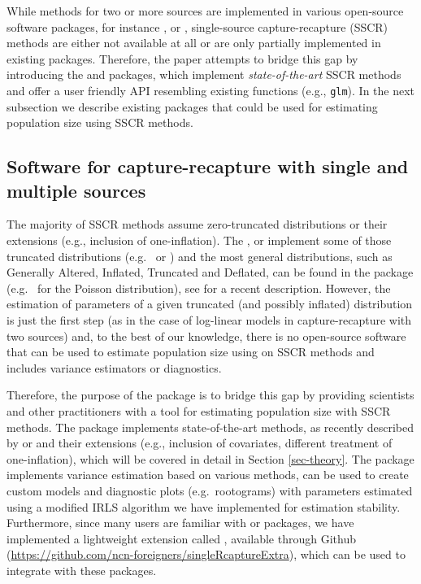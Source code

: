 \documentclass[
]{jss}
\newcommand{\1}{\mathcal{I}} \newcommand{\bZero}{\boldsymbol{0}}
\begin{document}
While methods for two or more sources are implemented in various
open-source software packages, for instance 
\citep{baillargeon2007rcapture},  \citep{laake2013marked} or
 \citep{yee2015vgam}, single-source capture-recapture (SSCR)
methods are either not available at all or are only partially
implemented in existing  packages. Therefore, the paper
attempts to bridge this gap by introducing the  and
 packages, which implement
\emph{state-of-the-art} SSCR methods and offer a user friendly API
resembling existing  functions (e.g., \texttt{glm}). In the
next subsection we describe existing  packages that could be
used for estimating population size using SSCR methods.

\subsection{Software for capture-recapture with single and multiple
sources}\label{sec-software}

The majority of SSCR methods assume zero-truncated distributions or
their extensions (e.g., inclusion of one-inflation). The 
\citep{countreg},  \citep{VGAM-main} or 
\citep{distributions3} implement some of those truncated distributions
(e.g.~ or )
and the most general distributions, such as Generally Altered, Inflated,
Truncated and Deflated, can be found in the  package
(e.g.~ for the Poisson distribution), see
\citet{gaitdcount} for a recent description. However, the estimation of
parameters of a given truncated (and possibly inflated) distribution is
just the first step (as in the case of log-linear models in
capture-recapture with two sources) and, to the best of our knowledge,
there is no open-source software that can be used to estimate population
size using on SSCR methods and includes variance estimators or
diagnostics.

Therefore, the purpose of the   package
is to bridge this gap by providing scientists and other practitioners
with a tool for estimating population size with SSCR methods. The
package implements state-of-the-art methods, as recently described by
\citet{bohning2018capture} or \citet{bohning2024one} and their
extensions (e.g., inclusion of covariates, different treatment of
one-inflation), which will be covered in detail in Section
\ref{sec-theory}. The package implements variance estimation based on
various methods, can be used to create custom models and diagnostic
plots (e.g.~rootograms) with parameters estimated using a modified IRLS
algorithm we have implemented for estimation stability. Furthermore,
since many  users are familiar with  or
 packages, we have implemented a lightweight extension called
, available through Github
(\url{https://github.com/ncn-foreigners/singleRcaptureExtra}), which can
be used to integrate  with these packages.
\end{document}
